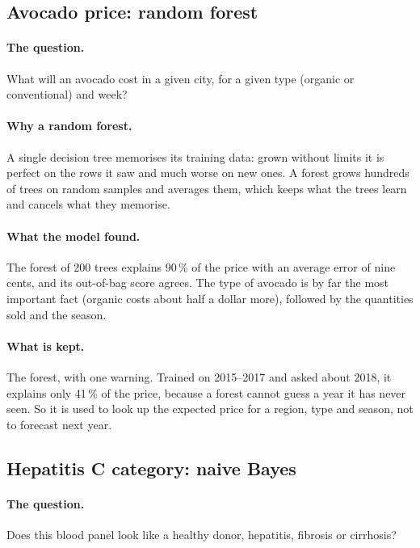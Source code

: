 \subsection{Avocado price: random forest}

\paragraph{The question.} What will an avocado cost in a given city, for
a given type (organic or conventional) and week?

\paragraph{Why a random forest.} A single decision tree memorises its
training data: grown without limits it is perfect on the rows it saw and
much worse on new ones. A forest grows hundreds of trees on random
samples and averages them, which keeps what the trees learn and cancels
what they memorise.

\paragraph{What the model found.} The forest of 200 trees explains 90\,\%
of the price with an average error of nine cents, and its out-of-bag
score agrees. The type of avocado is by far the most important fact
(organic costs about half a dollar more), followed by the quantities sold
and the season.

\paragraph{What is kept.} The forest, with one warning. Trained on
2015--2017 and asked about 2018, it explains only 41\,\% of the price,
because a forest cannot guess a year it has never seen. So it is used to
look up the expected price for a region, type and season, not to forecast
next year.

\subsection{Hepatitis C category: naive Bayes}

\paragraph{The question.} Does this blood panel look like a healthy
donor, hepatitis, fibrosis or cirrhosis?

